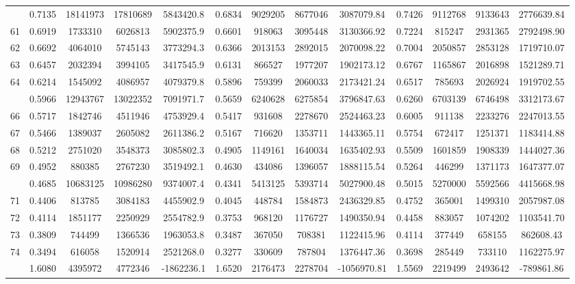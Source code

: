 \documentclass[
  12pt,
]{article}
\begin{document}
\begin{longtable}[t]{lcccccccccccc}
\addlinespace
60 & 0.7135 & 18141973 & 17810689 & 5843420.8 & 0.6834 & 9029205 & 8677046 & 3087079.84 & 0.7426 & 9112768 & 9133643 & 2776639.84\\
61 & 0.6919 & 1733310 & 6026813 & 5902375.9 & 0.6601 & 918063 & 3095448 & 3130366.92 & 0.7224 & 815247 & 2931365 & 2792498.90\\
62 & 0.6692 & 4064010 & 5745143 & 3773294.3 & 0.6366 & 2013153 & 2892015 & 2070098.22 & 0.7004 & 2050857 & 2853128 & 1719710.07\\
63 & 0.6457 & 2032394 & 3994105 & 3417545.9 & 0.6131 & 866527 & 1977207 & 1902173.12 & 0.6767 & 1165867 & 2016898 & 1521289.71\\
64 & 0.6214 & 1545092 & 4086957 & 4079379.8 & 0.5896 & 759399 & 2060033 & 2173421.24 & 0.6517 & 785693 & 2026924 & 1919702.55\\
\addlinespace
65 & 0.5966 & 12943767 & 13022352 & 7091971.7 & 0.5659 & 6240628 & 6275854 & 3796847.63 & 0.6260 & 6703139 & 6746498 & 3312173.67\\
66 & 0.5717 & 1842746 & 4511946 & 4753929.4 & 0.5417 & 931608 & 2278670 & 2524463.23 & 0.6005 & 911138 & 2233276 & 2247013.55\\
67 & 0.5466 & 1389037 & 2605082 & 2611386.2 & 0.5167 & 716620 & 1353711 & 1443365.11 & 0.5754 & 672417 & 1251371 & 1183414.88\\
68 & 0.5212 & 2751020 & 3548373 & 3085802.3 & 0.4905 & 1149161 & 1640034 & 1635402.93 & 0.5509 & 1601859 & 1908339 & 1444027.36\\
69 & 0.4952 & 880385 & 2767230 & 3519492.1 & 0.4630 & 434086 & 1396057 & 1888115.54 & 0.5264 & 446299 & 1371173 & 1647377.07\\
\addlinespace
70 & 0.4685 & 10683125 & 10986280 & 9374007.4 & 0.4341 & 5413125 & 5393714 & 5027900.48 & 0.5015 & 5270000 & 5592566 & 4415668.98\\
71 & 0.4406 & 813785 & 3084183 & 4455902.9 & 0.4045 & 448784 & 1584873 & 2436329.85 & 0.4752 & 365001 & 1499310 & 2057987.08\\
72 & 0.4114 & 1851177 & 2250929 & 2554782.9 & 0.3753 & 968120 & 1176727 & 1490350.94 & 0.4458 & 883057 & 1074202 & 1103541.70\\
73 & 0.3809 & 744499 & 1366536 & 1963053.8 & 0.3487 & 367050 & 708381 & 1122415.96 & 0.4114 & 377449 & 658155 & 862608.43\\
74 & 0.3494 & 616058 & 1520914 & 2521268.0 & 0.3277 & 330609 & 787804 & 1376447.36 & 0.3698 & 285449 & 733110 & 1162275.97\\
\addlinespace
75 & 1.6080 & 4395972 & 4772346 & -1862236.1 & 1.6520 & 2176473 & 2278704 & -1056970.81 & 1.5569 & 2219499 & 2493642 & -789861.86\\*
\end{longtable}
\endgroup{}
\end{document}
